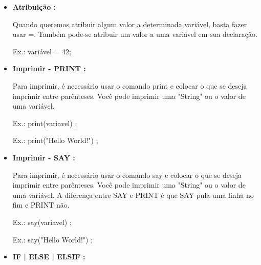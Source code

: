 \documentclass[a4paper]{article}
\begin{document}
{{{{{{{{{\begin{itemize}
        \bigskip
        
        \item \textbf{Atribuição :}
        
            Quando queremos atribuir algum valor a
            determinada variável, basta fazer usar 
            \textcolor{NavyBlue}{=}.
            Também pode-se atribuir um valor a uma
            variável em sua declaração.
            
            \textcolor{NavyBlue}{Ex.:}
            variável 
            \textcolor{NavyBlue}{=}
            42;
            
        \bigskip
        
        \item \textbf{Imprimir - PRINT : }
        
            Para imprimir, é necessário usar o
            comando 
            \textcolor{NavyBlue}{print} e
            colocar o que se deseja imprimir entre
            parênteses.
            Você pode imprimir uma "String" ou o 
            valor de uma variável.
            
            \textcolor{NavyBlue}{Ex.:}
            \textcolor{NavyBlue}{print(variavel)}
            ;
            
            \textcolor{NavyBlue}{Ex.:}
            \textcolor{NavyBlue}{print("Hello World!")}
            ;
       
       \bigskip
            
       \item \textbf{Imprimir - SAY : }
        
            Para imprimir, é necessário usar o
            comando 
            \textcolor{NavyBlue}{say} e
            colocar o que se deseja imprimir entre
            parênteses.
            Você pode imprimir uma "String" ou o 
            valor de uma variável.
            A diferença entre SAY e PRINT é que
            SAY pula uma linha no fim e PRINT não.
            
            \textcolor{NavyBlue}{Ex.:}
            \textcolor{NavyBlue}{say(variavel)}
            ;
            
            \textcolor{NavyBlue}{Ex.:}
            \textcolor{NavyBlue}{say("Hello World!")}
            ;
        
            
\newpage %
            
            
        \item \textbf{IF | ELSE | ELSIF : }
            

\end{itemize}}}}}}}}}}
\end{document}
